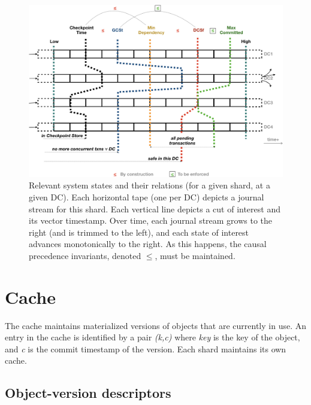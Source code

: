 \documentclass[11pt]{article}
\begin{document}
\begin{figure}[tp]
  \centering
  \includegraphics[width=\textwidth]{figures/cvts.png}
  \caption{%
    Relevant system states and their relations (for a given
    shard, at a given DC).
    Each horizontal tape (one per DC) depicts a journal stream for
    this shard.
    Each vertical line depicts a cut of interest and its
    vector timestamp.
    Over time, each journal stream grows to the right (and is
    trimmed to the left), and each state of interest advances
    monotonically to the right.
    As this happens, the causal precedence invariants, denoted
    $\le$, must be maintained.
  }
  \label{fig:system-vts}
\end{figure}


\section{Cache}
\label{sec:cache}

The cache maintains materialized versions of objects that are currently in use. 
An entry in the cache is identified by a pair \emph{(k,c)} where
\emph{key} is the key of the object, and \emph{c} is the commit timestamp of the
version. 
Each shard maintains its own cache.

\subsection{Object-version descriptors}
\label{sec:objects}
\end{document}

